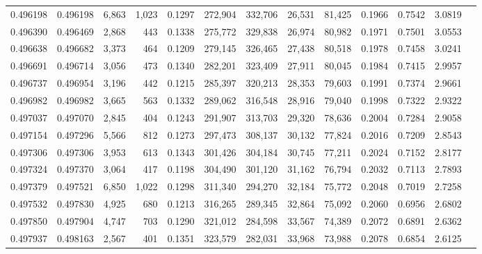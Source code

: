 \begin{tabular}{rrrrrrrrrrrrr}
0.496198 & 0.496198 & 6,863 & 1,023 &                                     0.1297 & 272,904 & 332,706 &  26,531 &  81,425 & 0.1966 & 0.7542 & 3.0819 \\
0.496390 & 0.496469 & 2,868 &   443 &                                     0.1338 & 275,772 & 329,838 &  26,974 &  80,982 & 0.1971 & 0.7501 & 3.0553 \\
0.496638 & 0.496682 & 3,373 &   464 &                                     0.1209 & 279,145 & 326,465 &  27,438 &  80,518 & 0.1978 & 0.7458 & 3.0241 \\
0.496691 & 0.496714 & 3,056 &   473 &                                     0.1340 & 282,201 & 323,409 &  27,911 &  80,045 & 0.1984 & 0.7415 & 2.9957 \\
0.496737 & 0.496954 & 3,196 &   442 &                                     0.1215 & 285,397 & 320,213 &  28,353 &  79,603 & 0.1991 & 0.7374 & 2.9661 \\
0.496982 & 0.496982 & 3,665 &   563 &                                     0.1332 & 289,062 & 316,548 &  28,916 &  79,040 & 0.1998 & 0.7322 & 2.9322 \\
0.497037 & 0.497070 & 2,845 &   404 &                                     0.1243 & 291,907 & 313,703 &  29,320 &  78,636 & 0.2004 & 0.7284 & 2.9058 \\
0.497154 & 0.497296 & 5,566 &   812 &                                     0.1273 & 297,473 & 308,137 &  30,132 &  77,824 & 0.2016 & 0.7209 & 2.8543 \\
0.497306 & 0.497306 & 3,953 &   613 &                                     0.1343 & 301,426 & 304,184 &  30,745 &  77,211 & 0.2024 & 0.7152 & 2.8177 \\
0.497324 & 0.497370 & 3,064 &   417 &                                     0.1198 & 304,490 & 301,120 &  31,162 &  76,794 & 0.2032 & 0.7113 & 2.7893 \\
0.497379 & 0.497521 & 6,850 & 1,022 &                                     0.1298 & 311,340 & 294,270 &  32,184 &  75,772 & 0.2048 & 0.7019 & 2.7258 \\
0.497532 & 0.497830 & 4,925 &   680 &                                     0.1213 & 316,265 & 289,345 &  32,864 &  75,092 & 0.2060 & 0.6956 & 2.6802 \\
0.497850 & 0.497904 & 4,747 &   703 &                                     0.1290 & 321,012 & 284,598 &  33,567 &  74,389 & 0.2072 & 0.6891 & 2.6362 \\
0.497937 & 0.498163 & 2,567 &   401 &                                     0.1351 & 323,579 & 282,031 &  33,968 &  73,988 & 0.2078 & 0.6854 & 2.6125 \\

\end{tabular}
